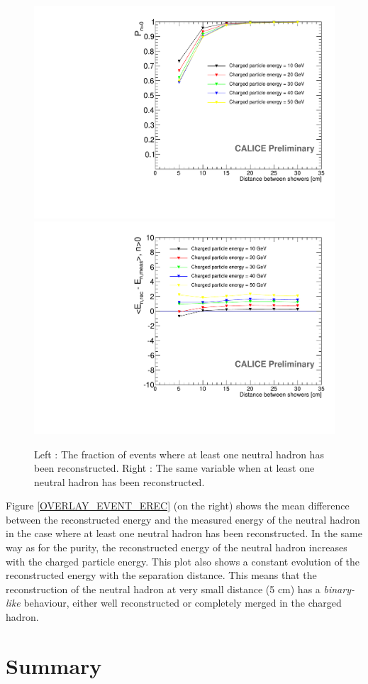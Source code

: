 \documentclass[cits]{JINST}
\begin{document}
\begin{figure}[!h]
  \begin{center}
    \includegraphics[width=0.47\linewidth]{plots/OverlayEvent_NeutralPercentage.pdf}
    \includegraphics[width=0.47\linewidth]{plots/OverlayEvent_NeutralEnergyDifferenceMeanNeutralEfficient.pdf}
  \end{center}
  \caption{\label{OVERLAY_EVENT_EREC} \label{OVERLAY_EVENT_NEUTRAL_PERCENTAGE} Left : The fraction of events where at least one neutral hadron has been reconstructed. Right : The same variable when at least one neutral hadron has been reconstructed.}
\end{figure}

Figure \ref{OVERLAY_EVENT_EREC} (on the right) shows the mean difference between the reconstructed energy and the measured energy of the neutral hadron in the case where at least one neutral hadron has been reconstructed. In the same way as for the purity, the reconstructed energy of the neutral hadron increases with the charged particle energy. This plot also shows a constant evolution of the reconstructed energy with the separation distance. This means that the reconstruction of the neutral hadron at very small distance (5 cm) has a \textit{binary-like} behaviour, either well reconstructed or completely merged in the charged hadron.

\newpage
\section{Summary}
\end{document}
